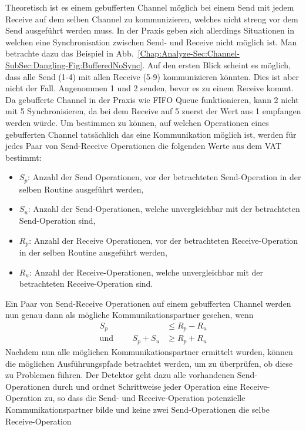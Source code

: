 Theoretisch ist es einem gebufferten Channel möglich bei einem Send mit 
jedem Receive auf dem selben Channel zu kommunizieren, welches nicht 
streng vor dem Send ausgeführt werden muss. In der Praxis geben sich allerdings 
Situationen in welchen eine Synchronisation zwischen Send- und Receive nicht 
möglich ist. Man betrachte dazu das Beispiel in 
Abb.~\ref{Chap:Analyze-Sec:Channel-SubSec:Dangling-Fig:BufferedNoSync}.
Auf den ersten Blick scheint es möglich, dass alle Send (1-4) mit allen 
Receive (5-9) kommunizieren könnten. Dies ist aber nicht der Fall.
Angenommen 1 und 2 senden, bevor es zu einem Receive kommt. Da gebufferte 
Channel in der Praxis wie FIFO Queue funktionieren, kann 2 nicht mit 5 
Synchronisieren, da bei dem Receive auf 5 zuerst der Wert aus 1 empfangen 
werden würde. Um bestimmen zu können, auf welchen Operationen eines 
gebufferten Channel tatsächlich das eine Kommunikation möglich ist, 
werden für jedes Paar von Send-Receive Operationen die folgenden Werte aus 
dem VAT bestimmt: 
\begin{itemize}
  \item $S_p$: Anzahl der Send Operationen, vor der betrachteten Send-Operation 
    in der selben Routine ausgeführt werden,
  \item $S_u$: Anzahl der Send-Operationen, welche unvergleichbar mit der 
    betrachteten Send-Operation sind,
  \item $R_p$: Anzahl der Receive Operationen, vor der betrachteten Receive-Operation 
    in der selben Routine ausgeführt werden,
  \item $R_u$: Anzahl der Receive-Operationen, welche unvergleichbar mit der 
    betrachteten Receive-Operation sind.
\end{itemize}
Ein Paar von Send-Receive Operationen auf einem gebufferten Channel werden nun 
genau dann als mögliche Kommunikationspartner gesehen, wenn 
\begin{align}
  S_p &\leq R_p - R_u  \label{Form:1}\\
  \text{und }\qquad S_p +  S_u &\geq R_p + R_u \label{Form:2}
\end{align}
Nachdem nun alle möglichen Kommunikationspartner ermittelt wurden, 
können die möglichen Ausführungspfade betrachtet werden, um zu überprüfen, 
ob diese zu Problemen führen. Der Detektor geht dazu alle vorhandenen Send-Operationen 
durch und ordnet Schrittweise jeder Operation eine Receive-Operation zu, so dass 
die Send- und Receive-Operation potenzielle Kommunikationspartner 
bilde und keine zwei Send-Operationen die selbe Receive-Operation 
